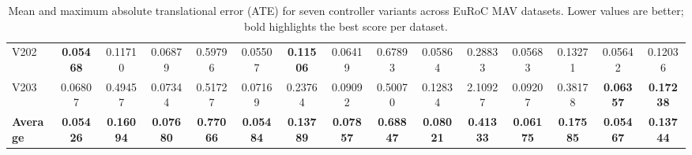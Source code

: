 \begin{table}[htbp]
{\begin{tabular}{l|cc|cc|cc|cc|cc|cc|cc}
V202 & \textbf{0.05468} & 0.11710 & 0.06879 & 0.59796 & 0.05507 & \textbf{0.11506} & 0.06419 & 0.67893 & 0.05864 & 0.28833 & 0.05683 & 0.13271 & 0.05642 & 0.12036 \\
V203 & 0.06807 & 0.49457 & 0.07344 & 0.51727 & 0.07169 & 0.23764 & 0.09092 & 0.50070 & 0.12834 & 2.10927 & 0.09207 & 0.38178 & \textbf{0.06357} & \textbf{0.17238} \\
\hline
\textbf{Average} & \textbf{0.05426} & \textbf{0.16094} & \textbf{0.07680} & \textbf{0.77066} & \textbf{0.05484} & \textbf{0.13789} & \textbf{0.07857} & \textbf{0.68847} & \textbf{0.08021} & \textbf{0.41333} & \textbf{0.06175} & \textbf{0.17585} & \textbf{0.05467} & \textbf{0.13744} \\
\hline
\hline
\end{tabular}}
\caption{Mean and maximum absolute translational error (ATE) for seven controller variants across EuRoC MAV datasets. Lower values are better; bold highlights the best score per dataset.}
\label{tab:ate_pid_omega_fov_oasis}
\end{table}
